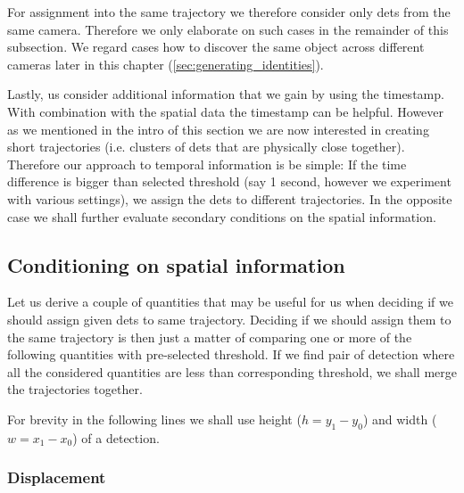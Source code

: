 For assignment into the same trajectory we therefore consider only \glspl{det}
from the same camera. Therefore we only elaborate on such cases in the remainder
of this subsection. We regard cases how to discover the same object across
different cameras later in this chapter (\autoref{sec:generating_identities}).


Lastly, us consider additional information that we gain by using the timestamp.
With combination with the spatial data the timestamp can be helpful. However as
we mentioned in the intro of this section
we are now interested in creating short trajectories (i.e. clusters of
\glspl{det} that are physically close together). Therefore
our approach to temporal information is be simple: If the time difference is
bigger than selected threshold (say 1 second, however we experiment with
various settings), we assign the \glspl{det} to different trajectories. In the
opposite case we shall further evaluate secondary conditions on the spatial
information.

\subsection{Conditioning on spatial information}

\label{ssec:spatial_merging}

Let us derive a couple of quantities that may be useful for us when deciding
if we should assign given \glspl{det} to same trajectory. Deciding if we should
assign them to the same trajectory is then just a matter of comparing one or
more of the following quantities with pre-selected threshold. If we find pair
of detection where all the considered quantities are less than corresponding
threshold, we shall merge the trajectories together.

For brevity in the following lines we shall use height ($h = y_1 - y_0$) and
width ($w = x_1 - x_0$) of a detection.

\subsubsection{Displacement}

